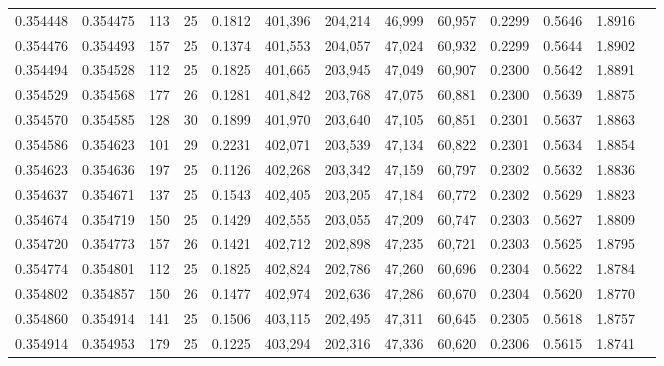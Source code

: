 \begin{tabular}{rrrrrrrrrrrrr}
0.354448 & 0.354475 &   113 &  25 &                                     0.1812 & 401,396 & 204,214 &  46,999 &  60,957 & 0.2299 & 0.5646 & 1.8916 \\
0.354476 & 0.354493 &   157 &  25 &                                     0.1374 & 401,553 & 204,057 &  47,024 &  60,932 & 0.2299 & 0.5644 & 1.8902 \\
0.354494 & 0.354528 &   112 &  25 &                                     0.1825 & 401,665 & 203,945 &  47,049 &  60,907 & 0.2300 & 0.5642 & 1.8891 \\
0.354529 & 0.354568 &   177 &  26 &                                     0.1281 & 401,842 & 203,768 &  47,075 &  60,881 & 0.2300 & 0.5639 & 1.8875 \\
0.354570 & 0.354585 &   128 &  30 &                                     0.1899 & 401,970 & 203,640 &  47,105 &  60,851 & 0.2301 & 0.5637 & 1.8863 \\
0.354586 & 0.354623 &   101 &  29 &                                     0.2231 & 402,071 & 203,539 &  47,134 &  60,822 & 0.2301 & 0.5634 & 1.8854 \\
0.354623 & 0.354636 &   197 &  25 &                                     0.1126 & 402,268 & 203,342 &  47,159 &  60,797 & 0.2302 & 0.5632 & 1.8836 \\
0.354637 & 0.354671 &   137 &  25 &                                     0.1543 & 402,405 & 203,205 &  47,184 &  60,772 & 0.2302 & 0.5629 & 1.8823 \\
0.354674 & 0.354719 &   150 &  25 &                                     0.1429 & 402,555 & 203,055 &  47,209 &  60,747 & 0.2303 & 0.5627 & 1.8809 \\
0.354720 & 0.354773 &   157 &  26 &                                     0.1421 & 402,712 & 202,898 &  47,235 &  60,721 & 0.2303 & 0.5625 & 1.8795 \\
0.354774 & 0.354801 &   112 &  25 &                                     0.1825 & 402,824 & 202,786 &  47,260 &  60,696 & 0.2304 & 0.5622 & 1.8784 \\
0.354802 & 0.354857 &   150 &  26 &                                     0.1477 & 402,974 & 202,636 &  47,286 &  60,670 & 0.2304 & 0.5620 & 1.8770 \\
0.354860 & 0.354914 &   141 &  25 &                                     0.1506 & 403,115 & 202,495 &  47,311 &  60,645 & 0.2305 & 0.5618 & 1.8757 \\
0.354914 & 0.354953 &   179 &  25 &                                     0.1225 & 403,294 & 202,316 &  47,336 &  60,620 & 0.2306 & 0.5615 & 1.8741 \\

\end{tabular}
